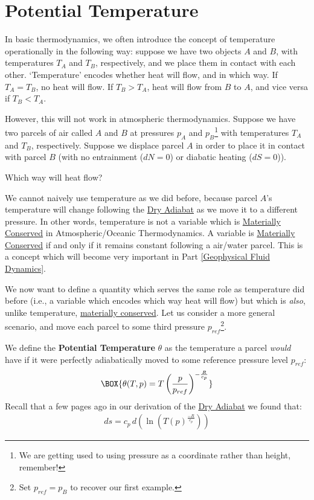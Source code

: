 \section{Potential Temperature}

In basic thermodynamics, we often introduce the concept of temperature operationally in the following way: suppose we have two objects $A$ and $B$, with temperatures $T_A$ and $T_B$, respectively, and we place them in contact with each other. `Temperature' encodes whether heat will flow, and in which way. If $T_A=T_B$, no heat will flow. If $T_B>T_A$, heat will flow from $B$ to $A$, and vice versa if $T_B<T_A$.

However, this will not work in atmospheric thermodynamics. Suppose we have two parcels of air called $A$ and $B$ at pressures $p_A$ and $p_B$\footnote{We are getting used to using pressure as a coordinate rather than height, remember!} with temperatures $T_A$ and $T_B$, respectively. Suppose we displace parcel $A$ in order to place it in contact with parcel $B$ (with no entrainment ($dN=0$) or diabatic heating ($dS=0$)).\vspace{5mm}

Which way will heat flow?\vspace{5mm}

We cannot naively use temperature as we did before, because parcel $A$'s temperature will change following the \hyperref[Dry Adiabat]{Dry Adiabat} as we move it to a different pressure. In other words, temperature is not a variable which is \hyperref[Material Conservation]{Materially Conserved} in Atmospheric/Oceanic Thermodynamics. A variable is \hyperref[Material Conservation]{Materially Conserved} if and only if it remains constant following a air/water parcel. This is a concept which will become very important in Part \ref{Geophysical Fluid Dynamics}.

We now want to define a quantity which serves the same role as temperature did before (i.e., a variable which encodes which way heat will flow) but which is \textit{also}, unlike temperature, \hyperref[Material Conservation]{materially conserved}. Let us consider a more general scenario, and move each parcel to some third pressure $p_{ref}$\footnote{Set $p_{ref}=p_B$ to recover our first example.}. 

We define the \textbf{Potential Temperature} $\theta$ as the temperature a parcel \textit{would} have if it were perfectly adiabatically moved to some reference pressure level $p_{ref}$:
\begin{align}\label{Potential Temperature}
    \BOX{\theta(T,p)=T\left(\frac{p}{p_{ref}}\right)^{-\frac{R}{c_p}}}
\end{align}
Recall that a few pages ago in our derivation of the \hyperref[Dry Adiabat]{Dry Adiabat} we found that:
\begin{align}
    \label{2.5}
    ds=c_p\,d\left(\ln \left(T(p)^\frac{-R}{c_p}\right)\right)
\end{align}

